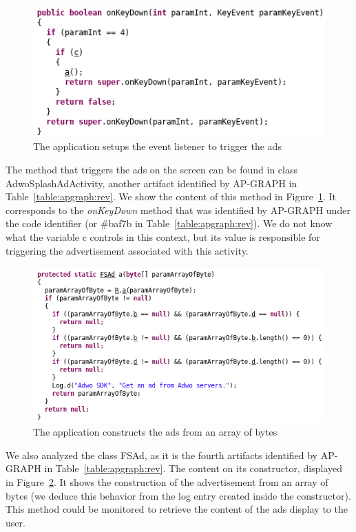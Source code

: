 \begin{figure}[!ht]
        \centering
	\includegraphics[width=0.75\linewidth]{figures/apgraph/listener.png}
	\caption{The application setups the event listener to trigger the ads}
	\label{figure:apgraph:listener}
\end{figure}

The method that triggers the ads on the screen can be found in class AdwoSplashAdActivity, another artifact identified by AP-GRAPH in Table~\ref{table:apgraph:rev}.
We show the content of this method in Figure~\ref{figure:apgraph:listener}.
It corresponds to the \textit{onKeyDown} method that was identified by AP-GRAPH under the code identifier  (or \#baf7b in Table~\ref{table:apgraph:rev}).
We do not know what the variable c controls in this context, but its value is responsible for triggering the advertisement associated with this activity.

\begin{figure}[!ht]
        \centering
	\includegraphics[width=0.9\linewidth]{figures/apgraph/ads.png}
	\caption{The application constructs the ads from an array of bytes}
	\label{figure:apgraph:ads}
\end{figure}

We also analyzed the class FSAd, as it is the fourth artifacts identified by AP-GRAPH in Table~\ref{table:apgraph:rev}.
The content on its constructor, displayed in Figure~\ref{figure:apgraph:ads}.
It shows the construction of the advertisement from an array of bytes (we deduce this behavior from the log entry created inside the constructor).
This method could be monitored to retrieve the content of the ads display to the user.

